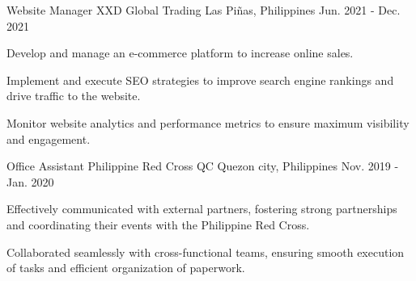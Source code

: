 \begin{cventries}
  \cventry
    {Website Manager} %
    {XXD Global Trading} %
    {Las Piñas, Philippines} %
    {Jun. 2021 - Dec. 2021} %
    {
      \begin{cvitems} %
        \item {Develop and manage an e-commerce platform to increase online sales.}
        \item {Implement and execute SEO strategies to improve search engine rankings and drive traffic to the website.}
        \item {Monitor website analytics and performance metrics to ensure maximum visibility and engagement.}
      \end{cvitems}
    }
  \cventry
    {Office Assistant} %
    {Philippine Red Cross QC} %
    {Quezon city, Philippines} %
    {Nov. 2019 - Jan. 2020} %
    {
      \begin{cvitems} %
        \item {Effectively communicated with external partners, fostering strong partnerships and coordinating their events with the Philippine Red Cross.}
        \item {Collaborated seamlessly with cross-functional teams, ensuring smooth execution of tasks and efficient organization of paperwork.}
      \end{cvitems}
    }

    


\end{cventries}
